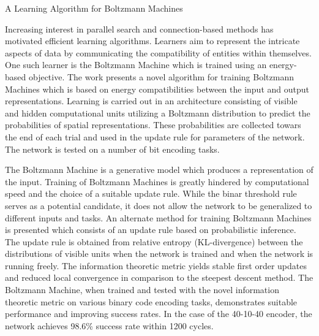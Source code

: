 \documentclass[11pt,letterpaper]{article}
\begin{document}
\begin{center}
  \large{A Learning Algorithm for Boltzmann Machines}
\end{center}


Increasing interest in parallel search and connection-based methods has motivated efficient learning algorithms. Learners aim to represent the intricate aspects of data by communicating the compatibility of entities within themselves. One such learner is the Boltzmann Machine which is trained using an energy-based objective. The work presents a novel algorithm for training Boltzmann Machines which is based on energy compatibilities between the input and output representations. Learning is carried out in an architecture consisting of visible and hidden computational units utilizing a Boltzmann distribution to predict the probabilities of spatial representations. These probabilities are collected towars the end of each trial and used in the update rule for parameters of the network. The network is tested on a number of bit encoding tasks. 

The Boltzmann Machine is a generative model which produces a representation of the input. Training of Boltzmann Machines is greatly hindered by computational speed and the choice of a suitable update rule. While the binar threshold rule serves as a potential candidate, it does not allow the network to be generalized to different inputs and tasks. An alternate method for training Boltzmann Machines is presented which consists of an update rule based on probabilistic inference. The update rule is obtained from relative entropy (KL-divergence) between the distributions of visible units when the network is trained and when the network is running freely. The information theoretic metric yields stable first order updates and reduced local convergence in comparison to the steepest descent method. The Boltzmann Machine, when trained and tested with the novel information theoretic metric on various binary code encoding tasks, demonstrates suitable performance and improving success rates. In the case of the 40-10-40 encoder, the network achieves 98.6\% success rate within 1200 cycles. 
\end{document}
